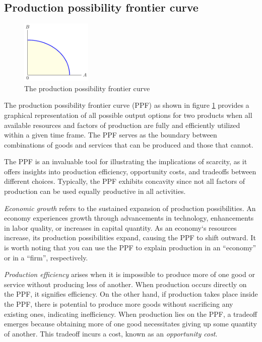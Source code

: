 \documentclass[
  12pt,
  oneside]{book}
\theoremstyle{definition}
\theoremstyle{definition}
\theoremstyle{definition}
\theoremstyle{definition}
\theoremstyle{remark}
\begin{document}
\hypertarget{production-possibility-frontier-curve}{%
\subsection{Production possibility frontier curve}\label{production-possibility-frontier-curve}}

\begin{figure}
\centering
\includegraphics[width=0.3\textwidth,height=\textheight]{fig/ppf1.png}
\caption{\label{fig:ppf} The production possibility frontier curve}
\end{figure}

The production possibility frontier curve (PPF) as shown in figure \ref{fig:ppf} provides a graphical representation of all possible output options for two products when all available resources and factors of production are fully and efficiently utilized within a given time frame. The PPF serves as the boundary between combinations of goods and services that can be produced and those that cannot.

The PPF is an invaluable tool for illustrating the implications of scarcity, as it offers insights into production efficiency, opportunity costs, and tradeoffs between different choices. Typically, the PPF exhibits concavity since not all factors of production can be used equally productive in all activities.

\emph{Economic growth} refers to the sustained expansion of production possibilities. An economy experiences growth through advancements in technology, enhancements in labor quality, or increases in capital quantity. As an economy`s resources increase, its production possibilities expand, causing the PPF to shift outward. It is worth noting that you can use the PPF to explain production in an ``economy'' or in a ``firm'', respectively.

\emph{Production efficiency} arises when it is impossible to produce more of one good or service without producing less of another. When production occurs directly on the PPF, it signifies efficiency. On the other hand, if production takes place inside the PPF, there is potential to produce more goods without sacrificing any existing ones, indicating inefficiency. When production lies on the PPF, a tradeoff emerges because obtaining more of one good necessitates giving up some quantity of another. This tradeoff incurs a cost, known as an \emph{opportunity cost}.
\end{document}
